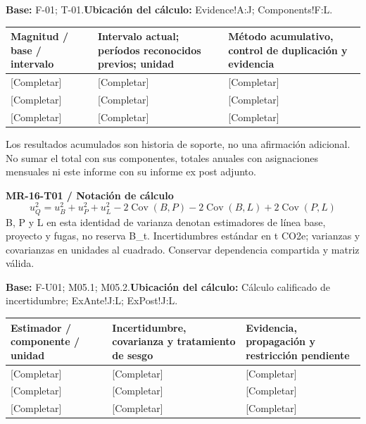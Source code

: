 \textbf{Base:} F-01; T-01.\quad\textbf{Ubicación del cálculo:} Evidence!A:J; Components!F:L.\par\endgroup
{\sffamily\fontsize{8.6}{10.7}\selectfont\begin{longtable}{@{}P{48mm}P{61mm}P{53mm}@{}}
\toprule
\textbf{Magnitud / base / intervalo} & \textbf{Intervalo actual; períodos reconocidos previos; unidad} & \textbf{Método acumulativo, control de duplicación y evidencia}\\\midrule\endhead
\rule{0pt}{8mm}[Completar] & [Completar] & [Completar]\\\hline
\rule{0pt}{8mm}[Completar] & [Completar] & [Completar]\\\hline
\rule{0pt}{8mm}[Completar] & [Completar] & [Completar]\\\hline
\end{longtable}}
Los resultados acumulados son historia de soporte, no una afirmación adicional. No sumar el total con sus componentes, totales anuales con asignaciones mensuales ni este informe con su informe ex post adjunto.\par
{}
\par\begingroup\sffamily\fontsize{8.4}{10.5}\selectfont\color{NEBGreen}
\textbf{MR-16-T01 / Notación de cálculo}\
{\fontsize{10}{12}\selectfont\[u_Q^2=u_B^2+u_P^2+u_L^2-2\operatorname{Cov}(B,P)-2\operatorname{Cov}(B,L)+2\operatorname{Cov}(P,L)\]}
B, P y L en esta identidad de varianza denotan estimadores de línea base, proyecto y fugas, no reserva B\_t. Incertidumbres estándar en t CO2e; varianzas y covarianzas en unidades al cuadrado. Conservar dependencia compartida y matriz válida.\par
\textbf{Base:} F-U01; M05.1; M05.2.\quad\textbf{Ubicación del cálculo:} Cálculo calificado de incertidumbre; ExAnte!J:L; ExPost!J:L.\par\endgroup
{\sffamily\fontsize{8.6}{10.7}\selectfont\begin{longtable}{@{}P{48mm}P{61mm}P{53mm}@{}}
\toprule
\textbf{Estimador / componente / unidad} & \textbf{Incertidumbre, covarianza y tratamiento de sesgo} & \textbf{Evidencia, propagación y restricción pendiente}\\\midrule\endhead
\rule{0pt}{8mm}[Completar] & [Completar] & [Completar]\\\hline
\rule{0pt}{8mm}[Completar] & [Completar] & [Completar]\\\hline
\rule{0pt}{8mm}[Completar] & [Completar] & [Completar]\\\hline
\end{longtable}}
